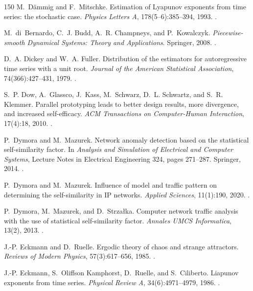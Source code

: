 \begin{thebibliography}{150}
M.~D{\"a}mmig and F.~Mitschke. Estimation of Lyapunov exponents from time series: the stochastic case. \emph{Physics Letters A}, 178(5--6):385--394, 1993. .

M.~di~Bernardo, C.~J. Budd, A.~R. Champneys, and P.~Kowalczyk. \emph{Piecewise-smooth Dynamical Systems: Theory and Applications}. Springer, 2008. .

D.~A. Dickey and W.~A. Fuller. Distribution of the estimators for autoregressive time series with a unit root. \emph{Journal of the American Statistical Association}, 74(366):427--431, 1979. .

S.~P. Dow, A.~Glassco, J.~Kass, M.~Schwarz, D.~L. Schwartz, and S.~R. Klemmer. Parallel prototyping leads to better design results, more divergence, and increased self-efficacy. \emph{ACM Transactions on Computer-Human Interaction}, 17(4):18, 2010. .

P.~Dymora and M.~Mazurek. Network anomaly detection based on the statistical self-similarity factor. In \emph{Analysis and Simulation of Electrical and Computer Systems}, Lecture Notes in Electrical Engineering 324, pages 271--287. Springer, 2014. .

P.~Dymora and M.~Mazurek. Influence of model and traffic pattern on determining the self-similarity in IP networks. \emph{Applied Sciences}, 11(1):190, 2020. .

P.~Dymora, M.~Mazurek, and D.~Strza{\l}ka. Computer network traffic analysis with the use of statistical self-similarity factor. \emph{Annales UMCS Informatica}, 13(2), 2013. .

J.-P. Eckmann and D.~Ruelle. Ergodic theory of chaos and strange attractors. \emph{Reviews of Modern Physics}, 57(3):617--656, 1985. .

J.-P. Eckmann, S.~Oliffson Kamphorst, D.~Ruelle, and S.~Ciliberto. Liapunov exponents from time series. \emph{Physical Review A}, 34(6):4971--4979, 1986. .


\end{thebibliography}
